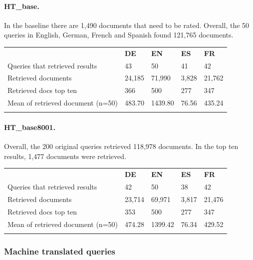 \documentclass[a4paper,11pt]{article}
\begin{document}
\paragraph{HT\_base.}
In the baseline there are 1,490 documents that need to be rated. Overall, the 50 queries in English, German, French and Spanish found 121,765 documents.

\begin{table}[h]
\centering
\begin{tabularx}{0.81\textwidth}{lllll}
\cmidrule{1-5}
\addlinespace
& \textbf{DE} & \textbf{EN} & \textbf{ES} & \textbf{FR} \\
\addlinespace
\cmidrule{1-5}
\addlinespace
Queries that retrieved results & 43 & 50 & 41 & 42 \\
Retrieved documents & 24,185 & 71,990 & 3,828 & 21,762 \\
Retrieved docs top ten & 366 & 500 & 277 & 347 \\
Mean of retrieved document (n=50) & 483.70 & 1439.80 & 76.56 & 435.24 \\
\addlinespace
\cmidrule{1-5}
\end{tabularx}
\label{result_list_analysis_base_8000}
\end{table}

\paragraph{HT\_base8001.}
Overall, the 200 original queries retrieved 118,978 documents. In the top ten results, 1,477 documents were retrieved.

\begin{table}[h]
\centering
\begin{tabularx}{0.81\textwidth}{lllll}
\cmidrule{1-5}
\addlinespace
& \textbf{DE} & \textbf{EN} & \textbf{ES} & \textbf{FR} \\
\addlinespace
\cmidrule{1-5}
\addlinespace
Queries that retrieved results & 42 & 50 & 38 & 42 \\
Retrieved documents & 23,714 & 69,971 & 3,817 & 21,476 \\
Retrieved docs top ten & 353 & 500 & 277 & 347 \\
Mean of retrieved document (n=50) & 474.28 & 1399.42 & 76.34 & 429.52 \\
\addlinespace
\cmidrule{1-5}
\end{tabularx}
\label{result_list_analysis_base_8001}
\end{table}

\subsubsection{Machine translated queries}
\end{document}
